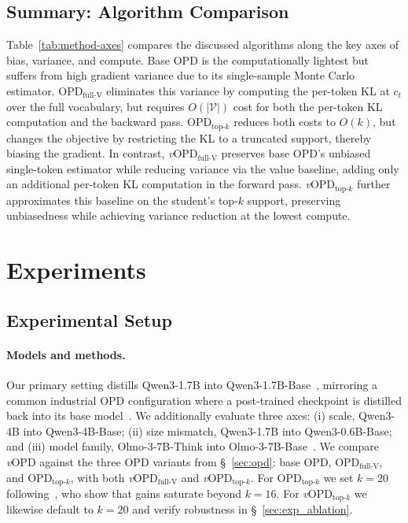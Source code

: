 \documentclass{article}
\newcommand{\method}{\emph{v}OPD}
\begin{document}
\subsection{Summary: Algorithm Comparison}
\label{sec:opd-comparison}
Table~\ref{tab:method-axes} compares the discussed algorithms along the key axes of bias, variance, and compute. Base OPD is the computationally lightest but suffers from high gradient variance due to its single-sample Monte Carlo estimator. $\text{OPD}_\text{full-V}$ eliminates this variance by computing the per-token KL at $c_t$ over the full vocabulary, but requires $O(|\mathcal{V}|)$ cost for both the per-token KL computation and the backward pass. $\text{OPD}_\text{top-$k$}$ reduces both costs to $O(k)$, but changes the objective by restricting the KL to a truncated support, thereby biasing the gradient. In contrast, \method$_\text{full-V}$ preserves base OPD's unbiased single-token estimator while reducing variance via the value baseline, adding only an additional per-token KL computation in the forward pass. \method$_\text{top-$k$}$ further approximates this baseline on the student's top-$k$ support, preserving unbiasedness while achieving variance reduction at the lowest compute.

\section{Experiments}
\subsection{Experimental Setup}
\label{sec:exp_setup}
\paragraph{Models and methods.} Our primary setting distills Qwen3-1.7B into Qwen3-1.7B-Base~\citep{yang2025qwen3}, mirroring a common industrial OPD configuration where a post-trained checkpoint is distilled back into its base model~\citep{zeng2026glm, yang2026nemotron2, deepseekai2026deepseekv4}. We additionally evaluate three axes: (i) scale, Qwen3-4B into Qwen3-4B-Base; (ii) size mismatch, Qwen3-1.7B into Qwen3-0.6B-Base; and (iii) model family, Olmo-3-7B-Think into Olmo-3-7B-Base~\citep{olmo2025olmo}. We compare \method{} against the three OPD variants from \S~\ref{sec:opd}: base OPD, {OPD}$_\text{full-V}$, and OPD$_\text{top-$k$}$, with both \method{}$_\text{full-V}$ and \method{}$_\text{top-$k$}$. For OPD$_\text{top-$k$}$ we set $k=20$ following~\citet{li2026rethinkingopd}, who show that gains saturate beyond $k{=}16$. For \method{}$_\text{top-$k$}$ we likewise default to $k=20$ and verify robustness in \S~\ref{sec:exp_ablation}.
\end{document}
